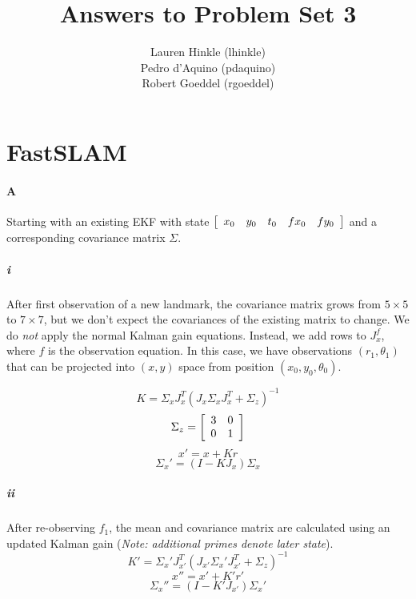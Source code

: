 \documentclass[12pt]{article}
\title{Answers to Problem Set 3}
\author{
	Lauren Hinkle (lhinkle)\\
	Pedro d'Aquino (pdaquino)\\
	Robert Goeddel (rgoeddel)}
\begin{document}
\maketitle
\pagebreak

\section{FastSLAM}

\paragraph{A}
Starting with an existing EKF with state $\left[\begin{array}{c c c c c}x_0 & y_0 & t_0 & fx_0 & fy_0\end{array}\right]$ and a corresponding covariance matrix $\Sigma$.
\subparagraph{i}
After first observation of a new landmark, the covariance matrix grows from $5\times 5$ to
$7 \times 7$, but we don't expect the covariances of the existing matrix
to change. We do \emph{not} apply the normal Kalman gain equations. Instead,
we add rows to $J_x^f$, where $f$ is the observation equation.
In this case, we have observations $(r_1, \theta_1)$ that can be projected
into $(x,y)$ space from position $(x_0, y_0, \theta_0)$. %

$$K = \Sigma_x J_x^T(J_x \Sigma_x J_x^T + \Sigma_z)^{-1} $$
$$\Sigma_z = \left[ \begin{array}{c c}
3 & 0 \\
0 & 1 \\
\end{array} \right]$$
$$x' = x + Kr$$
$$\Sigma_x' = (I - KJ_x) \Sigma_x$$

\subparagraph{ii}
After re-observing $f_1$, the mean and covariance matrix are calculated using an updated Kalman gain (\emph{Note: additional primes denote
    later state}).
$$K' = \Sigma_x' J_{x'}^T(J_{x'} \Sigma_x' J_{x'}^T + \Sigma_z)^{-1} $$
$$x'' = x' + K'r'$$
$$\Sigma_x'' = (I - K'J_{x'}) \Sigma_x'$$
\end{document}
